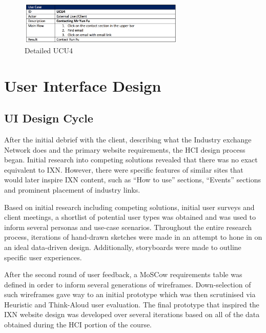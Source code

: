 \documentclass[fontsize=10pt]{extarticle}
\numberwithin{figure}{section} %
\begin{document}
\begin{figure}[H]
      \centering
      \includegraphics[trim = 0 0 0 0, clip, width=0.7\textwidth]{ph11.png}
      \caption{Detailed UCU4}
 \end{figure}

\hypertarget{user-interface-design}{%
\section{User Interface Design}\label{user-interface-design}}

\hypertarget{ui-design-cycle}{%
\subsection{UI Design Cycle}\label{ui-design-cycle}}

After the initial debrief with the client, describing what the Industry
exchange Network does and the primary website requirements, the HCI
design process began. Initial research into competing solutions revealed
that there was no exact equivalent to IXN. However, there were specific
features of similar sites that would later inspire IXN content, such as
``How to use'' sections, ``Events'' sections and prominent placement of
industry links.

Based on initial research including competing solutions, initial user
surveys and client meetings, a shortlist of potential user types was
obtained and was used to inform several personas and use-case scenarios.
Throughout the entire research process, iterations of hand-drawn
sketches were made in an attempt to hone in on an ideal data-driven
design. Additionally, storyboards were made to outline specific user
experiences.

After the second round of user feedback, a MoSCow requirements table was
defined in order to inform several generations of wireframes.
Down-selection of such wireframes gave way to an initial prototype which
was then scrutinised via Heuristic and Think-Aloud user evaluation. The
final prototype that inspired the IXN website design was developed over
several iterations based on all of the data obtained during the HCI
portion of the course.
\end{document}
